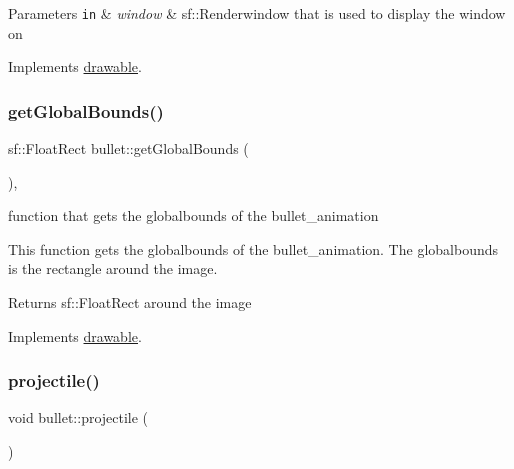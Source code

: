 \begin{DoxyParams}[1]{Parameters}
\mbox{\tt in}  & {\em window} & sf\+::\+Renderwindow that is used to display the window on \\
\hline
\end{DoxyParams}


Implements \hyperlink{classdrawable_a4e49e2c1121704c83ce24c5f48dd910f}{drawable}.

\mbox{\label{classbullet_a87bda5887249e8e37c5579180449bd93}} 
\subsubsection{\texorpdfstring{get\+Global\+Bounds()}{getGlobalBounds()}}
{\footnotesize\ttfamily sf\+::\+Float\+Rect bullet\+::get\+Global\+Bounds (\begin{DoxyParamCaption}{ }\end{DoxyParamCaption})\hspace{0.3cm}{\ttfamily [override]}, {\ttfamily [virtual]}}



function that gets the globalbounds of the bullet\+\_\+animation 

This function gets the globalbounds of the bullet\+\_\+animation. The globalbounds is the rectangle around the image.

\begin{DoxyReturn}{Returns}
sf\+::\+Float\+Rect around the image 
\end{DoxyReturn}


Implements \hyperlink{classdrawable_ae013ac0be47538be9ce885d6642daf73}{drawable}.

\mbox{\label{classbullet_a1f2cd5b7fa4d4beae1d27c06bc54f8c0}} 
\subsubsection{\texorpdfstring{projectile()}{projectile()}}
{\footnotesize\ttfamily void bullet\+::projectile (\begin{DoxyParamCaption}{ }\end{DoxyParamCaption})\hspace{0.3cm}{\ttfamily [private]}}



